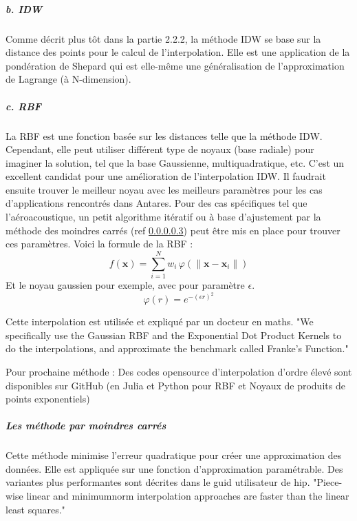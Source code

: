 \subparagraph{b. IDW}
Comme décrit plus tôt dans la partie 2.2.2, la méthode IDW se base sur la distance des points pour le calcul de l'interpolation. Elle est une application de la pondération de Shepard qui est elle-même une généralisation de l'approximation de Lagrange (à N-dimension).

\subparagraph{c. RBF}
La \ac{RBF} est une fonction basée sur les distances telle que la méthode IDW. Cependant, elle peut utiliser différent type de noyaux (base radiale) pour imaginer la solution, tel que la base Gaussienne, multiquadratique, etc. C'est un excellent candidat pour une amélioration de l'interpolation IDW. Il faudrait ensuite trouver le meilleur noyau avec les meilleurs paramètres pour les cas d'applications rencontrés dans Antares. Pour des cas spécifiques tel que l'aéroacoustique, un petit algorithme itératif ou à base d'ajustement par la méthode des moindres carrés (ref \ref{mc}) peut être mis en place pour trouver ces paramètres.
Voici la formule de la RBF :
\[
f(\mathbf{x}) = \sum_{i=1}^{N} w_{i} \, \varphi \left( \|\mathbf{x} - \mathbf{x}_{i}\| \right)
\]
Et le noyau gaussien pour exemple, avec pour paramètre \(\epsilon\).
\[
\varphi(r) = e^{-(\epsilon r)^{2}}
\]


Cette interpolation est utilisée et expliqué par un docteur en maths\cite{Rosenfeld}.%
"We specifically use the Gaussian RBF and the Exponential Dot Product Kernels to do the interpolations, and approximate the benchmark called Franke's Function."\cite{opensource_2}

Pour prochaine méthode : Des codes opensource d'interpolation d'ordre élevé sont disponibles sur GitHub (en Julia\cite{opensource} et Python\cite{opensource_2} pour RBF et Noyaux de produits de points exponentiels)

\subparagraph{Les méthode par moindres carrés}\label{mc}

Cette méthode minimise l'erreur quadratique pour créer une approximation des données. Elle est appliquée sur une fonction d'approximation paramétrable. Des variantes plus performantes sont décrites dans le guid utilisateur de hip.
"Piece-wise linear and minimumnorm interpolation approaches are faster than the linear least squares."\cite{muller2020}


